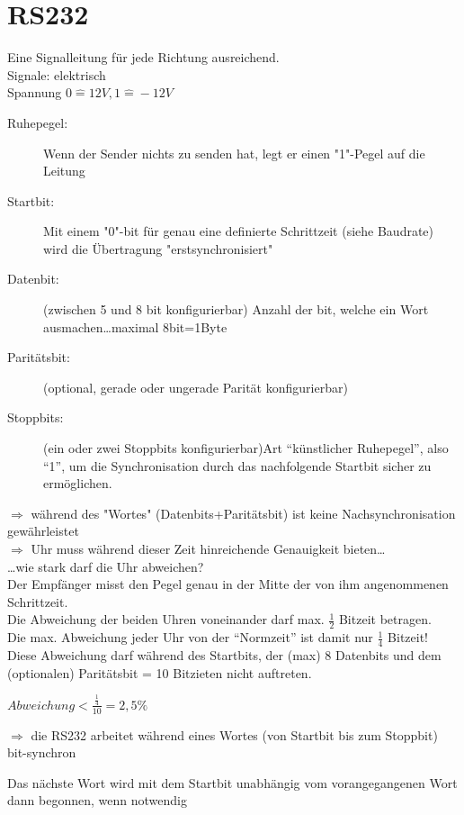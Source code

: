 \section{RS232}
Eine Signalleitung für jede Richtung ausreichend.\\
Signale: elektrisch\\
Spannung $0\hat{=}12V, 1\hat{=}-12V$
\par
\begin{description}
\item[Ruhepegel:]Wenn der Sender nichts zu senden hat, legt er einen "1"-Pegel auf die Leitung
\item[Startbit:]Mit einem "0"-bit für genau eine definierte Schrittzeit (siehe Baudrate) wird die Übertragung "erstsynchronisiert"
\item[Datenbit:](zwischen 5 und 8 bit konfigurierbar) Anzahl der bit, welche ein Wort ausmachen\dots maximal 8bit=1Byte
\item[Paritätsbit:](optional, gerade oder ungerade Parität konfigurierbar)
\item[Stoppbits:](ein oder zwei Stoppbits konfigurierbar)Art “künstlicher Ruhepegel”, also “1”, um die Synchronisation durch das nachfolgende Startbit sicher zu ermöglichen.
\end{description}
$\Rightarrow$ während des "Wortes" (Datenbits+Paritätsbit) ist keine Nachsynchronisation gewährleistet\\
$\Rightarrow$ Uhr muss während dieser Zeit hinreichende Genauigkeit bieten\dots\\
\dots wie stark darf die Uhr abweichen?\\
Der Empfänger misst den Pegel genau in der Mitte der von ihm angenommenen Schrittzeit.\\
Die Abweichung der beiden Uhren voneinander darf max. $\frac{1}{2}$ Bitzeit betragen.\\
Die max. Abweichung jeder Uhr von der “Normzeit” ist damit nur $\frac{1}{4}$ Bitzeit!\\
Diese Abweichung darf während des Startbits, der (max) 8 Datenbits und dem (optionalen) Paritätsbit = 10 Bitzieten nicht auftreten.
\begin{center}
$Abweichung < \frac{\frac{1}{4}}{10}=2,5\%$
\end{center}
$\Rightarrow$ die RS232 arbeitet während eines Wortes (von Startbit bis zum Stoppbit) bit-synchron
\par
Das nächste Wort wird mit dem Startbit unabhängig vom vorangegangenen Wort dann begonnen, wenn notwendig\\

